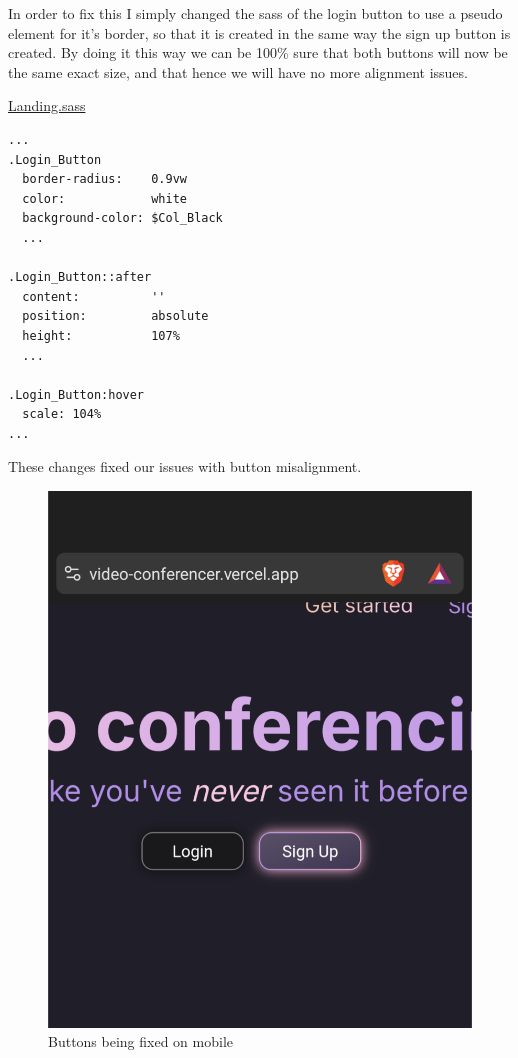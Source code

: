 In order to fix this I simply changed the sass of the login
button to use a pseudo element for it's border, so that it is
created in the same way the sign up button is created. By
doing it this way we can be 100\% sure that both buttons will
now be the same exact size, and that hence we will have no
more alignment issues. \\ \vspace{0.2cm}

\underline{Landing.sass}

\begin{verbatim}
...
.Login_Button
  border-radius:    0.9vw
  color:            white
  background-color: $Col_Black
  ...

.Login_Button::after
  content:          ''
  position:         absolute
  height:           107%
  ...

.Login_Button:hover
  scale: 104%
...
\end{verbatim}

These changes fixed our issues with button misalignment.

\begin{figure}[H]
\centering

\includegraphics[scale=0.2]{Images/Buttons_aligned.png}

\caption{Buttons being fixed on mobile}
\end{figure}

